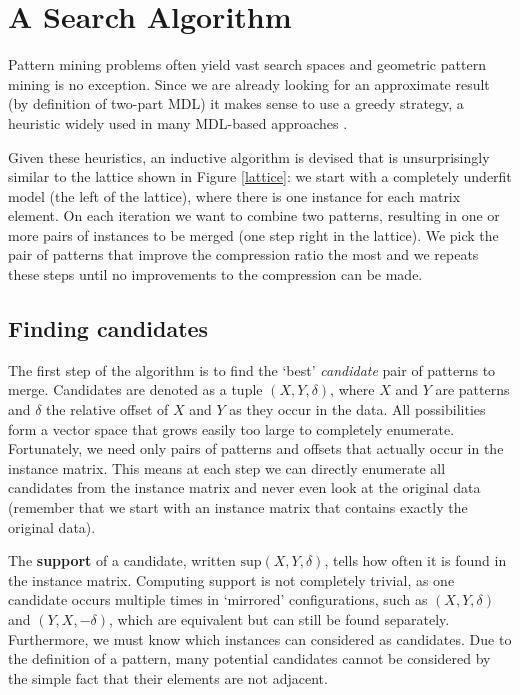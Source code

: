 \documentclass{llncs}
\begin{document}
\section{A Search Algorithm}

Pattern mining problems often yield vast search spaces and geometric pattern mining is no exception. Since we are already looking for an approximate result (by definition of two-part MDL) it makes sense to use a greedy strategy, a heuristic widely used in many MDL-based approaches \cite{krimp,slim,classy}. 


Given these heuristics, an inductive algorithm is devised that is unsurprisingly similar to the lattice shown in Figure \ref{lattice}:  we start with a completely underfit model (the left of the lattice), where there is one instance for each matrix element. On each iteration we want to combine two patterns, resulting in one or more pairs of instances to be merged (one step right in the lattice). We pick the pair of patterns that improve the compression ratio the most and we repeats these steps until no improvements to the compression can be made.

\subsection{Finding candidates}

The first step of the algorithm is to find the `best' \emph{candidate} pair of patterns to merge. Candidates are denoted as a tuple $(X,Y,\delta)$, where $X$ and $Y$ are patterns and $\delta$ the relative offset of $X$ and $Y$ as they occur in the data. All possibilities form a vector space that grows easily too large to completely enumerate. Fortunately, we need only pairs of patterns and offsets that actually occur in the instance matrix. This means at each step we can directly enumerate all candidates from the instance matrix and never even look at the original data (remember that we start with an instance matrix that contains exactly the original data).  

The \textbf{support} of a candidate, written $\mathrm{sup}(X,Y,\delta)$, tells how often it is found in the instance matrix. Computing support is not completely trivial, as one candidate occurs multiple times in `mirrored' configurations, such as $(X,Y,\delta)$ and $(Y,X,-\delta)$, which are equivalent but can still be found separately. Furthermore, we must know which instances can considered as candidates. Due to the definition of a pattern, many potential candidates cannot be considered by the simple fact that their elements are not adjacent.
\end{document}
